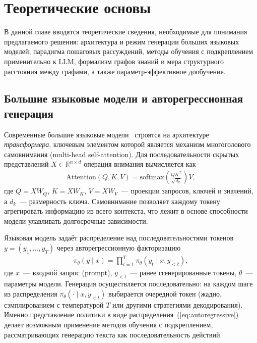\section{Теоретические основы}
\label{sec:Theory} 

В данной главе вводятся теоретические сведения, необходимые для понимания предлагаемого решения: архитектура и режим генерации больших языковых моделей, парадигма пошаговых рассуждений, методы обучения с подкреплением применительно к LLM, формализм графов знаний и мера структурного расстояния между графами, а также параметр-эффективное дообучение.

\subsection{Большие языковые модели и авторегрессионная генерация}
\label{subsec:theory-llm}

Современные большие языковые модели~\cite{brown2020language, touvron2023llama} строятся на архитектуре \textit{трансформера}, ключевым элементом которой является механизм многоголового самовнимания (multi-head self-attention). Для последовательности скрытых представлений $X \in \mathbb{R}^{n \times d}$ операция внимания вычисляется как
\begin{align}
    \mathrm{Attention}(Q, K, V) = \mathrm{softmax}\!\left(\frac{QK^\top}{\sqrt{d_k}}\right) V,
    \label{eq:attention}
\end{align}
где $Q = XW_Q$, $K = XW_K$, $V = XW_V$~--- проекции запросов, ключей и значений, а $d_k$~--- размерность ключа. Самовнимание позволяет каждому токену агрегировать информацию из всего контекста, что лежит в основе способности модели улавливать долгосрочные зависимости.

Языковая модель задаёт распределение над последовательностями токенов $y = (y_1, \ldots, y_T)$ через авторегрессионную факторизацию
\begin{align}
    \pi_\theta(y \mid x) = \prod_{t=1}^{T} \pi_\theta(y_t \mid x, y_{<t}),
    \label{eq:autoregressive}
\end{align}
где $x$~--- входной запрос (prompt), $y_{<t}$~--- ранее сгенерированные токены, $\theta$~--- параметры модели. Генерация осуществляется последовательно: на каждом шаге из распределения $\pi_\theta(\cdot \mid x, y_{<t})$ выбирается очередной токен (жадно, сэмплированием с температурой $T$ или другими стратегиями декодирования). Именно представление политики в виде распределения~(\ref{eq:autoregressive}) делает возможным применение методов обучения с подкреплением, рассматривающих генерацию текста как последовательность действий.

